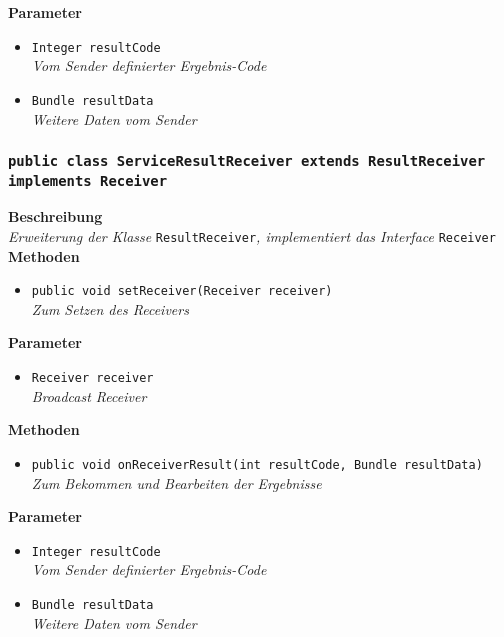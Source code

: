 	\textbf{Parameter}
	\begin{itemize}
		\item\texttt{Integer resultCode}\\ 
	\textit{Vom Sender definierter Ergebnis-Code}\\
		\item\texttt{Bundle resultData}\\ 
	\textit{Weitere Daten vom Sender }\\
	\end{itemize}

\subsubsection{\texttt{public class ServiceResultReceiver extends ResultReceiver implements Receiver}}

	\textbf{Beschreibung} \\
	\textit{Erweiterung der Klasse} \texttt{ResultReceiver}\textit{, implementiert das Interface} \texttt{Receiver}\\

	\textbf{Methoden}
	\begin{itemize}
		\item\texttt{{public void setReceiver(Receiver receiver)}}\\
	\textit{Zum Setzen des Receivers}\\
	\end{itemize}
	
	\textbf{Parameter}
	\begin{itemize}
		\item\texttt{Receiver receiver}\\ 
	\textit{Broadcast Receiver}\\
	\end{itemize}
	
	\textbf{Methoden}
	\begin{itemize}
		\item\texttt{{public void onReceiverResult(int resultCode, Bundle resultData)}}\\
	\textit{Zum Bekommen und Bearbeiten der Ergebnisse}\\
	\end{itemize}

	\textbf{Parameter}
	\begin{itemize}
		\item\texttt{Integer resultCode}\\ 
	\textit{Vom Sender definierter Ergebnis-Code}\\
		\item\texttt{Bundle resultData}\\ 
	\textit{Weitere Daten vom Sender }\\
	\end{itemize}

